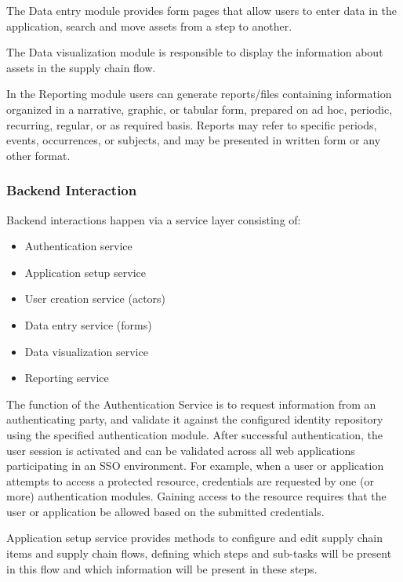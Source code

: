 The Data entry module provides form pages that allow users to enter data in the application, search and move assets from a step to another.

The Data visualization module is responsible to display the information about assets in the supply chain flow. 

In the Reporting module users can generate reports/files containing information organized in a narrative, graphic, or tabular form, prepared on ad hoc, periodic, recurring, regular, or as required basis. Reports may refer to specific periods, events, occurrences, or subjects, and may be presented in written form or any other format.

\subsubsection{Backend Interaction}\label{sec:BackendInteraction}
Backend interactions happen via a service layer consisting of:

\begin{itemize}
\item Authentication service
\item Application setup service
\item User creation service (actors)
\item Data entry service (forms)
\item Data visualization service
\item Reporting service
\end{itemize}

The function of the Authentication Service is to request information from an authenticating party, and validate it against the configured identity repository using the specified authentication module. After successful authentication, the user session is activated and can be validated across all web applications participating in an SSO environment. For example, when a user or application attempts to access a protected resource, credentials are requested by one (or more) authentication modules. Gaining access to the resource requires that the user or application be allowed based on the submitted credentials.

Application setup service provides methods to configure and edit  supply chain items and supply chain flows, defining which steps and sub-tasks will be present in this flow and which information will be present in these steps.

